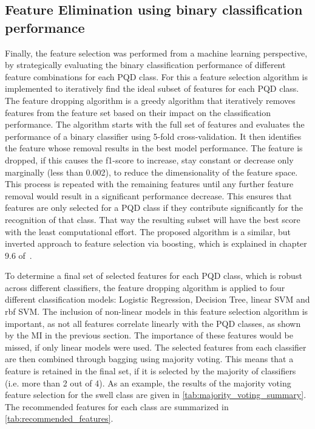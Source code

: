\subsection{Feature Elimination using binary classification performance}

Finally, the feature selection was performed from a machine learning perspective, by strategically evaluating the binary classification performance of different feature combinations for each PQD class.
For this a feature selection algorithm is implemented to iteratively find the ideal subset of features for each PQD class. The feature dropping algorithm is a greedy algorithm that iteratively removes features from the feature set based on their impact on the classification performance. The algorithm starts with the full set of features and evaluates the performance of a binary classifier using 5-fold cross-validation. It then identifies the feature whose removal results in the best model performance. The feature is dropped, if this causes the f1-score to increase, stay constant or decrease only marginally (less than 0.002), to reduce the dimensionality of the feature space. This process is repeated with the remaining features until any further feature removal would result in a significant performance decrease. This ensures that features are only selected for a PQD class if they contribute significantly for the recognition of that class. That way the resulting subset will have the best score with the least computational effort. The proposed algorithm is a similar, but inverted approach to feature selection via boosting, which is explained in chapter 9.6 of~\cite{ML_Refined_book}.

To determine a final set of selected features for each PQD class, which is robust across different classifiers, the feature dropping algorithm is applied to four different classification models: Logistic Regression, Decision Tree, linear SVM and rbf SVM. The inclusion of non-linear models in this feature selection algorithm is important, as not all features correlate linearly with the PQD classes, as shown by the MI in the previous section. The importance of these features would be missed, if only linear models were used. The selected features from each classifier are then combined through bagging using majority voting. This means that a feature is retained in the final set, if it is selected by the majority of classifiers (i.e. more than 2 out of 4). As an example, the results of the majority voting feature selection for the swell class are given in \autoref{tab:majority_voting_summary}. The recommended features for each class are summarized in \autoref{tab:recommended_features}.

